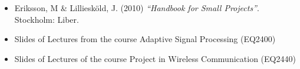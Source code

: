 \documentclass[11pt]{article}
\begin{document}
\begin{itemize}
\item Eriksson, M \& Lilliesköld, J. (2010) \textit{``Handbook for Small Projects''}. Stockholm: Liber.
\item Slides of Lectures from the course Adaptive Signal Processing (EQ2400)
\item Slides of Lectures of the course Project in Wireless Communication (EQ2440)
\end{itemize}




\end{document}

